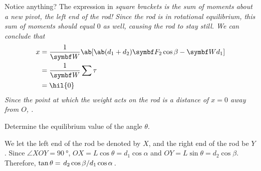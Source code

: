 Notice anything? The expression in \it{square brackets} is the sum of moments
about a new pivot, the left end of the rod! Since the rod is in
rotational equilibrium,
this sum of moments should equal \(0\) as well, causing the rod to stay still.
We can conclude that
\begin{align*}
  x
  &= \f{1}{\mv{W}} \ab[\ab(d_1+d_2)\mv{F}_2\cos\beta - \mv{W}d_1] \\
  &= \f{1}{\mv{W}} \sum\tau \\
  &= \hil{0}
\end{align*}
Since the point at which the weight acts on the rod is a distance of \(x = 0\)
away from \(O\), .

\begin{problem}
  Determine the equilibrium value of the angle \(\theta\).
\end{problem}
We let the left end of the rod be denoted by \(X\), and the right end
of the rod be \(Y\).
Since \(\angle XOY=\qty{90}{\degree}\), \(OX=L\cos\theta =
d_1\cos\alpha\) and \(OY =
L\sin\theta=d_2\cos\beta\). Therefore, \(\tan\theta =
\lf{d_2\cos\beta}{d_1\cos\alpha}\).

